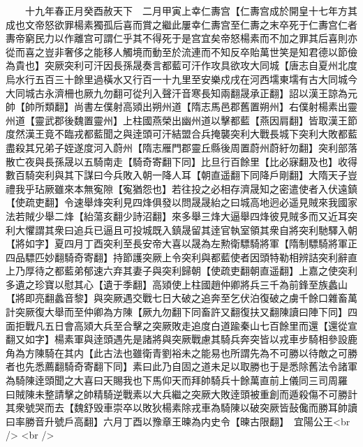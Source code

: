 　　十九年春正月癸酉赦天下　二月甲寅上幸仁夀宫【仁夀宫成於開皇十七年方其成也文帝怒欲罪楊素獨孤后喜而賞之繼此屢幸仁夀宫至仁夀之末卒死于仁夀宫仁者夀帝窮民力以作離宫可謂仁乎其不得死于是宫宜矣帝怒楊素而不加之罪其后喜則亦從而喜之豈非奢侈之能移人觸境而動至於流連而不知反卒貽萬世笑是知君德以節儉為貴也】突厥突利可汗因長孫晟奏言都藍可汗作攻具欲攻大同城【唐志自夏州北度烏水行五百三十餘里過橫水又行百一十九里至安樂戍戌在河西壖東壖有古大同城今大同城古永濟柵也厥九勿翻可從刋入聲汗音寒長知兩翻晟承正翻】詔以漢王諒為元帥【帥所類翻】尚書左僕射高熲出朔州道【隋志馬邑郡舊置朔州】右僕射楊素出靈州道【靈武郡後魏置靈州】上柱國燕榮出幽州道以擊都藍【燕因肩翻】皆取漢王節度然漢王竟不臨戎都藍聞之與逹頭可汗結盟合兵掩襲突利大戰長城下突利大敗都藍盡殺其兄弟子姪遂度河入蔚州【隋志雁門郡靈丘縣後周置蔚州蔚紆勿翻】突利部落散亡夜與長孫晟以五騎南走【騎奇寄翻下同】比旦行百餘里【比必寐翻及也】收得數百騎突利與其下謀曰今兵敗入朝一降人耳【朝直遥翻下同降戶剛翻】大隋天子豈禮我乎玷厥雖來本無寃隙【寃猶怨也】若往投之必相存濟晟知之密遣使者入伏遠鎮【使疏吏翻】令速舉烽突利見四烽俱發以問晟晟紿之曰城高地迥必遥見賊來我國家法若賊少舉二烽【紿蕩亥翻少詩沼翻】來多舉三烽大逼舉四烽彼見賊多而又近耳突利大懼謂其衆曰追兵已逼且可投城既入鎮晟留其逹官執室領其衆自將突利馳驛入朝【將如字】夏四月丁酉突利至長安帝大喜以晟為左勲衛驃騎將軍【隋制驃騎將軍正四品驃匹妙翻騎奇寄翻】持節護突厥上令突利與都藍使者因頭特勒相辨詰突利辭直上乃厚待之都藍弟郁速六弃其妻子與突利歸朝【使疏吏翻朝直遥翻】上嘉之使突利多遺之珍寶以慰其心【遺于季翻】高熲使上柱國趙仲卿將兵三千為前鋒至族蠡山【將即亮翻蠡音黎】與突厥遇交戰七日大破之追奔至乞伏泊復破之虜千餘口雜畜萬計突厥復大舉而至仲卿為方陳【厥九勿翻下同畜許又翻復扶又翻陳讀曰陣下同】四面拒戰凡五日會高熲大兵至合擊之突厥敗走追度白道踰秦山七百餘里而還【還從宣翻又如字】楊素軍與逹頭遇先是諸將與突厥戰慮其騎兵奔突皆以戎車步騎相參設鹿角為方陳騎在其内【此古法也雖衛青劉裕未之能易也所謂先為不可勝以待敵之可勝者也先悉薦翻騎奇寄翻下同】素曰此乃自固之道未足以取勝也于是悉除舊法令諸軍為騎陳逹頭聞之大喜曰天賜我也下馬仰天而拜帥騎兵十餘萬直前上儀同三司周羅曰賊陳未整請擊之帥精騎逆戰素以大兵繼之突厥大敗逹頭被重創而遁殺傷不可勝計其衆號哭而去【魏舒毁車崇卒以敗狄楊素除戎車為騎陳以破突厥皆鼔儳而勝耳帥讀曰率勝音升號戶高翻】六月丁酉以豫章王暕為内史令【暕古限翻】　宜陽公王<br />
<br />
